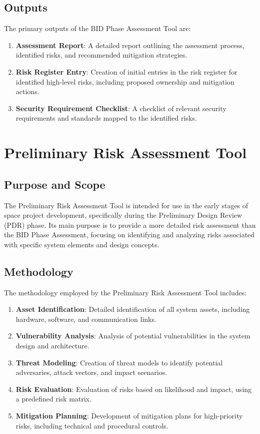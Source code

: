 \documentclass[binding=0.6cm]{sapthesis}
\begin{document}
\subsection{Outputs}

The primary outputs of the BID Phase Assessment Tool are:

\begin{enumerate}
    \item \textbf{Assessment Report}: A detailed report outlining the assessment process, identified risks, and recommended mitigation strategies.
    \item \textbf{Risk Register Entry}: Creation of initial entries in the risk register for identified high-level risks, including proposed ownership and mitigation actions.
    \item \textbf{Security Requirement Checklist}: A checklist of relevant security requirements and standards mapped to the identified risks.
\end{enumerate}

\section{Preliminary Risk Assessment Tool}

\subsection{Purpose and Scope}

The Preliminary Risk Assessment Tool is intended for use in the early stages of space project development, specifically during the Preliminary Design Review (PDR) phase. Its main purpose is to provide a more detailed risk assessment than the BID Phase Assessment, focusing on identifying and analyzing risks associated with specific system elements and design concepts.

\subsection{Methodology}

The methodology employed by the Preliminary Risk Assessment Tool includes:

\begin{enumerate}
    \item \textbf{Asset Identification}: Detailed identification of all system assets, including hardware, software, and communication links.
    \item \textbf{Vulnerability Analysis}: Analysis of potential vulnerabilities in the system design and architecture.
    \item \textbf{Threat Modeling}: Creation of threat models to identify potential adversaries, attack vectors, and impact scenarios.
    \item \textbf{Risk Evaluation}: Evaluation of risks based on likelihood and impact, using a predefined risk matrix.
    \item \textbf{Mitigation Planning}: Development of mitigation plans for high-priority risks, including technical and procedural controls.
\end{enumerate}
\end{document}
